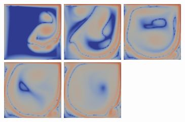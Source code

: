 \documentclass[english, nochinese]{pkupaper}
\begin{document}
\begin{figure}
{
\centering
{
\includegraphics[width=3cm]{Results/Figure02a.pdf}
\includegraphics[width=3cm]{Results/Figure02b.pdf}
\includegraphics[width=3cm]{Results/Figure02c.pdf}
\includegraphics[width=3cm]{Results/Figure02d.pdf}
\includegraphics[width=3cm]{Results/Figure02e.pdf}
}

}
\end{figure}
\end{document}
